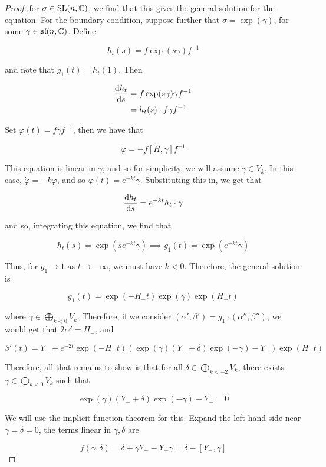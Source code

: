 \documentclass{report}
\renewcommand{\sl}{\mathfrak{sl}}
\begin{document}
\begin{proof}
    for \(\sigma \in \operatorname{SL}(n, \mathbb{C})\), we find that this gives the general solution for the equation. For the boundary condition, suppose further that \(\sigma = \exp(\gamma)\), for some \(\gamma \in \sl(n, \C)\). Define

    \[h_t(s) = f\exp(s\gamma)f^{-1}\]

    and note that \(g_1(t) = h_t(1)\). Then

    \begin{align*}
        \dv{h_t}{s}(s) &= f \exp(s\gamma)\gamma f^{-1} \\
        &= h_t(s) \cdot f \gamma f^{-1}
    \end{align*}

    Set \(\varphi(t) = f\gamma f^{-1}\), then we have that

    \[\dot\varphi = -f[H, \gamma]f^{-1}\]

    This equation is linear in \(\gamma\), and so for simplicity, we will assume \(\gamma \in V_k\). In this case, \(\dot\varphi = -k\varphi\), and so \(\varphi(t) = e^{-kt}\gamma\). Substituting this in, we get that

    \[\dv{h_t}{s} = e^{-kt}h_t \cdot \gamma\]

    and so, integrating this equation, we find that

    \[h_t(s) = \exp(se^{-kt}\gamma) \implies g_1(t) = \exp(e^{-kt}\gamma)\]

    Thus, for \(g_1 \to 1\) as \(t \to -\infty\), we must have \(k < 0\). Therefore, the general solution is

    \[g_1(t) = \exp(-H_-t)\exp(\gamma)\exp(H_-t)\]

    where \(\gamma \in \bigoplus\limits_{k < 0}V_k\). Therefore, if we consider \((\alpha', \beta') = g_1 \cdot (\alpha'', \beta'')\), we would get that \(2\alpha' = H_-\), and

    \[\beta'(t) = Y_- + e^{-2t}\exp(-H_-t)(\exp(\gamma)(Y_- + \delta)\exp(-\gamma) - Y_-)\exp(H_-t)\]

    Therefore, all that remains to show is that for all \(\delta \in \bigoplus\limits_{k < -2}V_k\), there exists \(\gamma \in \bigoplus\limits_{k < 0}V_k\) such that

    \[\exp(\gamma)(Y_- + \delta)\exp(-\gamma) - Y_- = 0\]

    We will use the implicit function theorem for this. Expand the left hand side near \(\gamma = \delta = 0\), the terms linear in \(\gamma, \delta\) are

    \[f(\gamma, \delta) = \delta + \gamma Y_- - Y_-\gamma = \delta - [Y_-, \gamma]\]


\end{proof}
\end{document}
